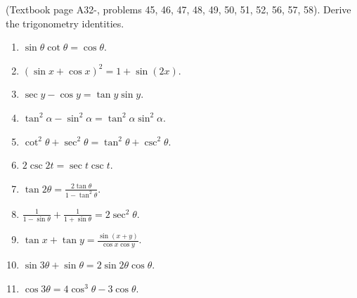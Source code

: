 (Textbook page A32-, problems 45, 46, 47, 48, 49, 50, 51, 52, 56, 57, 58).
Derive the trigonometry identities.
\begin{multicols}{3}
\begin{enumerate}
\item $\sin \theta\cot \theta =\cos \theta$.
\item $(\sin x +\cos x)^2=1+\sin(2x)$.
\item $\sec y - \cos y= \tan y \sin y$.
\item $\tan^2 \alpha-\sin^2 \alpha=\tan^2\alpha\sin^2\alpha$.
\item $\cot^2\theta+\sec^2\theta=\tan^2\theta+\csc^2\theta$.
\item $2\csc 2t= \sec t \csc t$.
\item $\tan 2\theta =\frac{2\tan \theta}{1-\tan^2\theta} $.
\item $\frac{1}{1-\sin \theta}+ \frac{1}{1+\sin \theta}=2\sec^2\theta$.
\item $\tan x + \tan y = \frac{\sin (x+y)}{\cos x \cos y}$.
\item $\sin 3\theta +\sin \theta = 2 \sin 2\theta \cos \theta $.
\item $\cos 3\theta = 4\cos^3\theta-3\cos \theta $.
\end{enumerate} 
\end{multicols}
